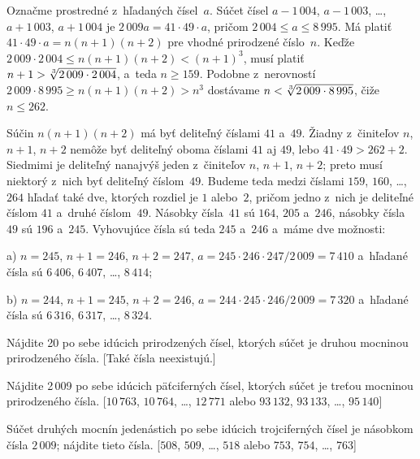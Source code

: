 {%
Označme prostredné z~hľadaných čísel~$a$. Súčet čísel $a-1\,004$, $a-1\,003$, \dots, $a+1\,003$, $a+1\,004$ je $2\,009a=41\cdot49\cdot a$, pričom $2\,004\le a\le 8\,995$. Má platiť $41\cdot49\cdot a=n(n+1)(n+2)$ pre vhodné prirodzené číslo~$n$. Keďže $2\,009\cdot2\,004\le n(n+1)(n+2)<(n+1)^3$, musí platiť $n+1>\root3\of{2\,009\cdot2\,004}$, a~teda $n\ge159$. Podobne z~nerovností $2\,009\cdot8\,995\ge n(n+1)(n+2)>n^3$ dostávame $n<\root3\of{2\,009\cdot8\,995}$, čiže $n\le262$.

Súčin $n(n+1)(n+2)$ má byť deliteľný číslami $41$ a~$49$. Žiadny z~činiteľov $n$, $n+1$, $n+2$ nemôže byť deliteľný oboma číslami $41$ aj $49$, lebo $41\cdot49>262+2$. Siedmimi je deliteľný nanajvýš jeden z~činiteľov $n$, $n+1$, $n+2$; preto musí niektorý z~nich byť deliteľný číslom~$49$. Budeme teda medzi číslami $159$, $160$, \dots, $264$ hľadať také dve, ktorých rozdiel je $1$ alebo~$2$, pričom jedno z~nich je deliteľné číslom $41$ a~druhé číslom~$49$. Násobky čísla~$41$ sú $164$, $205$ a~$246$, násobky čísla $49$ sú $196$ a~$245$. Vyhovujúce čísla sú teda $245$ a~$246$ a~máme dve možnosti:

a) $n=245$, $n+1=246$, $n+2=247$, $a=245\cdot246\cdot247/2\,009=7\,410$ a~hľadané čísla sú $6\,406$, $6\,407$, \dots, $8\,414$;

b) $n=244$, $n+1=245$, $n+2=246$, $a=244\cdot245\cdot246/2\,009=7\,320$ a~hľadané čísla sú $6\,316$, $6\,317$, \dots, $8\,324$.

Nájdite 20 po sebe idúcich prirodzených čísel, ktorých súčet je druhou mocninou prirodzeného čísla.
[Také čísla neexistujú.]

Nájdite 2\,009 po sebe idúcich päťciferných čísel, ktorých súčet je treťou mocninou prirodzeného čísla.
[$10\,763$, $10\,764$, \dots, $12\,771$ alebo $93\,132$, $93\,133$, \dots, $95\,140$]

\D
Súčet druhých mocnín jedenástich po sebe idúcich trojciferných čísel je násobkom čísla $2\,009$; nájdite tieto čísla.
[$508$, $509$, \dots, $518$ alebo $753$, $754$, \dots, $763$]
}

